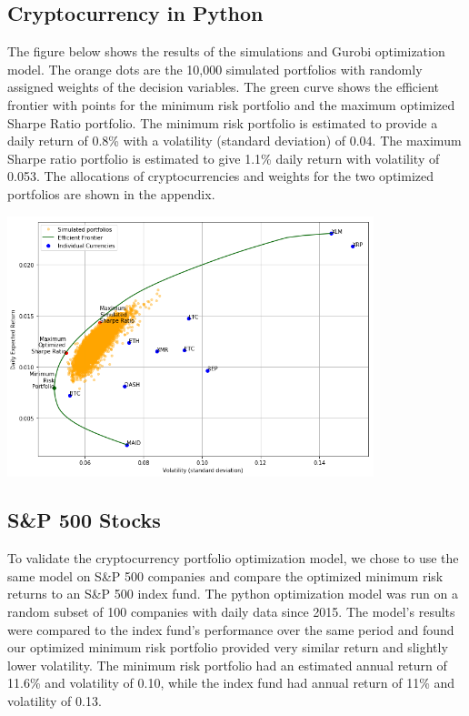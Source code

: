 \documentclass[12pt]{article} %
\begin{document}
\subsection{Cryptocurrency in Python}

The figure below shows the results of the simulations and Gurobi optimization model. The orange dots are the 10,000 simulated portfolios with randomly assigned weights of the decision variables. The green curve shows the efficient frontier with points for the minimum risk portfolio and the maximum optimized Sharpe Ratio portfolio. The minimum risk portfolio is estimated to provide a daily return of 0.8\% with a volatility (standard deviation) of 0.04. The maximum Sharpe ratio portfolio is estimated to give 1.1\% daily return with volatility of 0.053. The allocations of cryptocurrencies and weights for the two optimized portfolios are shown in the appendix.

\includegraphics[width=0.8\textwidth]{crypt1}

\subsection{S\&P 500 Stocks}

To validate the cryptocurrency portfolio optimization model, we chose to use the same model on S\&P 500 companies and compare the optimized minimum risk returns to an S\&P 500 index fund. The python optimization model was run on a random subset of 100 companies with daily data since 2015. The model’s results were compared to the index fund's performance over the same period and found our optimized minimum risk portfolio provided very similar return and slightly lower volatility. The minimum risk portfolio had an estimated annual return of 11.6\% and volatility of 0.10, while the index fund had annual return of 11\% and volatility of 0.13. 
\end{document}
